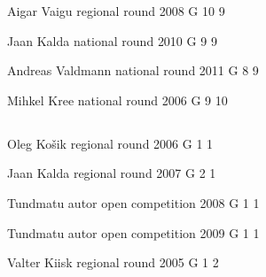 \documentclass[11pt]{article}
\begin{document}
\ylDisplay{} %
{Aigar Vaigu} %
{regional round} %
{2008} %
{G 10} %
{9} %
{

\ifEngStatement
\fi
}

\ylDisplay{} %
{Jaan Kalda} %
{national round} %
{2010} %
{G 9} %
{9} %
{

\ifEngStatement
\fi
}

\ylDisplay{} %
{Andreas Valdmann} %
{national round} %
{2011} %
{G 8} %
{9} %
{

\ifEngStatement
\fi
}

\ylDisplay{} %
{Mihkel Kree} %
{national round} %
{2006} %
{G 9} %
{10} %
{

\ifEngStatement
\fi
}
\newpage\subsection{\protect{}}

\ylDisplay{} %
{Oleg Košik} %
{regional round} %
{2006} %
{G 1} %
{1} %
{

\ifEngStatement
\fi
}

\ylDisplay{} %
{Jaan Kalda} %
{regional round} %
{2007} %
{G 2} %
{1} %
{

\ifEngStatement
\fi
}

\ylDisplay{} %
{Tundmatu autor} %
{open competition} %
{2008} %
{G 1} %
{1} %
{

\ifEngStatement
\fi
}

\ylDisplay{} %
{Tundmatu autor} %
{open competition} %
{2009} %
{G 1} %
{1} %
{

\ifEngStatement
\fi
}

\ylDisplay{} %
{Valter Kiisk} %
{regional round} %
{2005} %
{G 1} %
{2} %
{

\ifEngStatement
\fi
}
\end{document}
